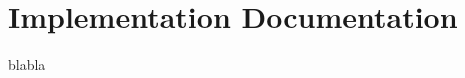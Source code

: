 \documentclass[a4paper]{article}
\begin{document}
\section{Implementation Documentation}
\label{sec:2}
blabla









\end{document}
